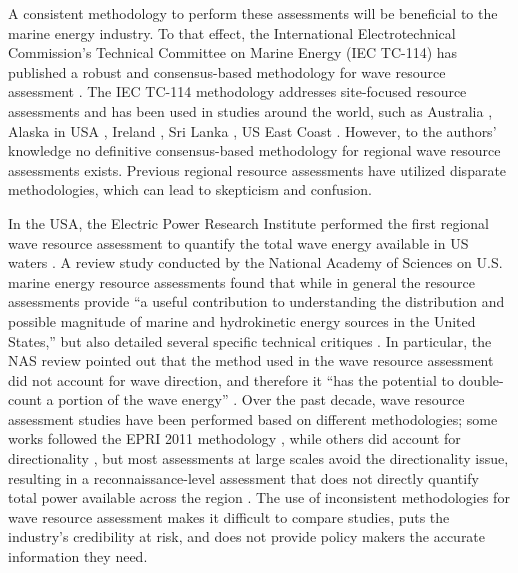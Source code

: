 A consistent methodology to perform these assessments will be beneficial to the marine energy industry. To that effect, the International Electrotechnical Commission's Technical Committee on Marine Energy (IEC TC-114) has published a robust and consensus-based methodology for wave resource assessment \citep[][hereafter, 62600-101]{internationalelectrotechnicalcommissionPart101Wave2015}. The IEC TC-114 methodology addresses site-focused resource assessments and has been used in studies around the world, such as Australia \citep{hemerRevisedAssessmentAustralia2017}, Alaska in USA \citep{garciamedinaWaveResourceCharacterization2021}, Ireland \citep{ramosExploringUtilityEffectiveness2016}, Sri Lanka \citep{lokuliyanaSriLankanWave2020}, US East Coast \citep{ahnNearshoreWaveEnergy2021}. However, to the authors’ knowledge no definitive consensus-based methodology for regional wave resource assessments exists. Previous regional resource assessments have utilized disparate methodologies, which can lead to skepticism and confusion. 

In the USA, the Electric Power Research Institute performed the first regional wave resource assessment to quantify the total wave energy available in US waters \citep[][hereafter, EPRI 2011]{EPRIwaveresource2011}. A review study conducted by the National Academy of Sciences on U.S. marine energy resource assessments found that while in general the resource assessments provide “a useful contribution to understanding the distribution and possible magnitude of marine and hydrokinetic energy sources in the United States,” but also detailed several specific technical critiques \citep{nationalresearchcouncilEvaluationDepartmentEnergy2013}. In particular, the NAS review pointed out that the method used in the wave resource assessment did not account for wave direction, and therefore it “has the potential to double-count a portion of the wave energy” \citep{nationalresearchcouncilEvaluationDepartmentEnergy2013}. Over the past decade, wave resource assessment studies have been performed based on different methodologies; some works followed the EPRI 2011 methodology \citep[e.g., ]{kumarWaveEnergyResource2015}, while others did account for directionality \citep{gunnQuantifyingGlobalWave2012, regueroGlobalWavePower2015}, but most assessments at large scales avoid the directionality issue, resulting in a reconnaissance-level assessment that does not directly quantify total power available across the region \citep{iglesiasWaveEnergyPotential2009, neillWavePowerVariability2013, sierraWaveEnergyResource2013, robertsonCharacterizingShoreWave2014, alonsoWaveEnergyResource2015, zhengAssessingChinaSea2013}. The use of inconsistent methodologies for wave resource assessment makes it difficult to compare studies, puts the industry’s credibility at risk, and does not provide policy makers the accurate information they need. 

